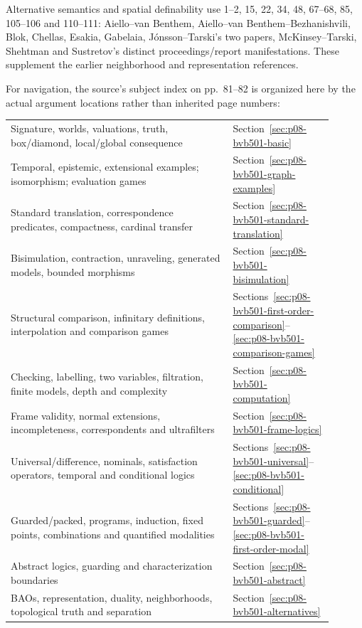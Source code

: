 Alternative semantics and spatial definability use 1--2, 15, 22, 34,
48, 67--68, 85, 105--106 and 110--111: Aiello--van Benthem,
Aiello--van Benthem--Bezhanishvili, Blok, Chellas, Esakia,
Gabelaia, J\'onsson--Tarski's two papers, McKinsey--Tarski,
Shehtman and Sustretov's distinct proceedings/report manifestations.
These supplement the earlier neighborhood and representation references.

For navigation, the source's subject index on pp.~81--82 is organized
here by the actual argument locations rather than inherited page numbers:
\begin{center}
\begin{tabular}{p{0.62\linewidth}p{0.28\linewidth}}
Signature, worlds, valuations, truth, box/diamond, local/global consequence
 & Section~\ref{sec:p08-bvb501-basic}\\
Temporal, epistemic, extensional examples; isomorphism; evaluation games
 & Section~\ref{sec:p08-bvb501-graph-examples}\\
Standard translation, correspondence predicates, compactness, cardinal transfer
 & Section~\ref{sec:p08-bvb501-standard-translation}\\
Bisimulation, contraction, unraveling, generated models, bounded morphisms
 & Section~\ref{sec:p08-bvb501-bisimulation}\\
Structural comparison, infinitary definitions, interpolation and comparison games
 & Sections~\ref{sec:p08-bvb501-first-order-comparison}--\ref{sec:p08-bvb501-comparison-games}\\
Checking, labelling, two variables, filtration, finite models, depth and complexity
 & Section~\ref{sec:p08-bvb501-computation}\\
Frame validity, normal extensions, incompleteness, correspondents and ultrafilters
 & Section~\ref{sec:p08-bvb501-frame-logics}\\
Universal/difference, nominals, satisfaction operators, temporal and conditional logics
 & Sections~\ref{sec:p08-bvb501-universal}--\ref{sec:p08-bvb501-conditional}\\
Guarded/packed, programs, induction, fixed points, combinations and quantified modalities
 & Sections~\ref{sec:p08-bvb501-guarded}--\ref{sec:p08-bvb501-first-order-modal}\\
Abstract logics, guarding and characterization boundaries
 & Section~\ref{sec:p08-bvb501-abstract}\\
BAOs, representation, duality, neighborhoods, topological truth and separation
 & Section~\ref{sec:p08-bvb501-alternatives}
\end{tabular}
\end{center}
